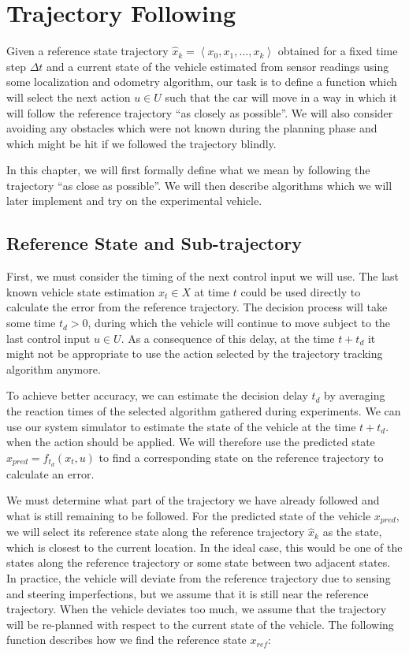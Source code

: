 \chapter{Trajectory Following}
\label{chapter:following}

Given a reference state trajectory $\hat{x}_k=\left\langle x_0, x_1, \ldots, x_k \right\rangle$ obtained for a fixed time step $\Delta t$ and a current state of the vehicle estimated from sensor readings using some localization and odometry algorithm, our task is to define a function which will select the next action $u\in U$ such that the car will move in a way in which it will follow the reference trajectory ``as closely as possible''. We will also consider avoiding any obstacles which were not known during the planning phase and which might be hit if we followed the trajectory blindly.

In this chapter, we will first formally define what we mean by following the trajectory ``as close as possible''. We will then describe algorithms which we will later implement and try on the experimental vehicle.

\section{Reference State and Sub-trajectory}

First, we must consider the timing of the next control input we will use. The last known vehicle state estimation $x_t\in X$ at time $t$ could be used directly to calculate the error from the reference trajectory. The decision process will take some time $t_d>0$, during which the vehicle will continue to move subject to the last control input $u\in U$. As a consequence of this delay, at the time $t+t_d$ it might not be appropriate to use the action selected by the trajectory tracking algorithm anymore.

To achieve better accuracy, we can estimate the decision delay $t_d$ by averaging the reaction times of the selected algorithm gathered during experiments. We can use our system simulator to estimate the state of the vehicle at the time $t+t_d$. when the action should be applied. We will therefore use the predicted state $x_{pred}=f_{t_d}(x_t,u)$ to find a corresponding state on the reference trajectory to calculate an error.

We must determine what part of the trajectory we have already followed and what is still remaining to be followed.  For the predicted state of the vehicle $x_{pred}$, we will select its reference state along the reference trajectory $\hat{x}_k$ as the state, which is closest to the current location. In the ideal case, this would be one of the states along the reference trajectory or some state between two adjacent states. In practice, the vehicle will deviate from the reference trajectory due to sensing and steering imperfections, but we assume that it is still near the reference trajectory. When the vehicle deviates too much, we assume that the trajectory will be re-planned with respect to the current state of the vehicle. The following function describes how we find the reference state $x_{ref}$:

